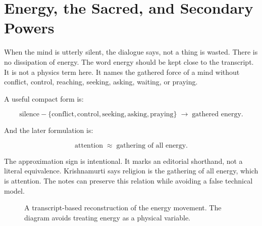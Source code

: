 \section{Energy, the Sacred, and Secondary Powers}

When the mind is utterly silent, the dialogue says, not a thing is wasted. There is no dissipation of energy. The word energy should be kept close to the transcript. It is not a physics term here. It names the gathered force of a mind without conflict, control, reaching, seeking, asking, waiting, or praying.

A useful compact form is:

\begin{equation}
\text{silence}
-
\{\text{conflict},\text{control},\text{seeking},\text{asking},\text{praying}\}
\;\longrightarrow\;
\text{gathered energy}.
\end{equation}

And the later formulation is:

\begin{equation}
\text{attention}
\;\approx\;
\text{gathering of all energy}.
\end{equation}

The approximation sign is intentional. It marks an editorial shorthand, not a literal equivalence. Krishnamurti says religion is the gathering of all energy, which is attention. The notes can preserve this relation while avoiding a false technical model.

\begin{figure}
\centering
{}
\caption{A transcript-based reconstruction of the energy movement. The diagram avoids treating energy as a physical variable.}
\end{figure}

